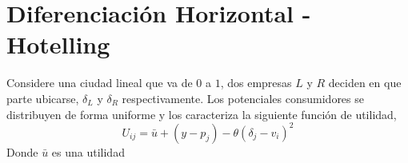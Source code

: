 \section{Diferenciación Horizontal - Hotelling}

Considere una ciudad lineal que va de $0$ a $1$, dos empresas $L$ y $R$ deciden en que parte ubicarse, $\delta _L$ y $\delta_R$ respectivamente. Los potenciales consumidores se distribuyen de forma uniforme y los caracteriza la siguiente función de utilidad,
\begin{equation*}
    U_{ij} = \bar{u} + (y-p_j) - \theta (\delta_j - v_i)^2 \label{función utilidad}
\end{equation*}
Donde $\bar{u}$ es una utilidad 